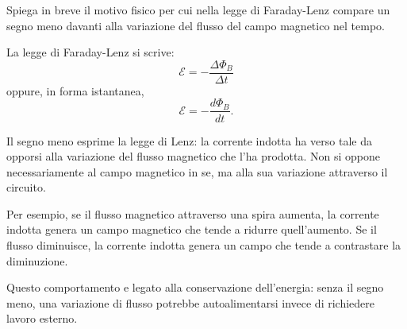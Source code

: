 
\begin{esercizio}
Spiega in breve il motivo fisico per cui nella legge di Faraday-Lenz compare
un segno meno davanti alla variazione del flusso del campo magnetico nel tempo.
\end{esercizio}

\begin{soluzione}
La legge di Faraday-Lenz si scrive:
\[
\mathcal{E}=-\frac{\Delta\Phi_B}{\Delta t}
\]
oppure, in forma istantanea,
\[
\mathcal{E}=-\frac{d\Phi_B}{dt}.
\]

Il segno meno esprime la legge di Lenz: la corrente indotta ha verso tale da
opporsi alla variazione del flusso magnetico che l'ha prodotta. Non si oppone
necessariamente al campo magnetico in se, ma alla sua variazione attraverso il
circuito.

Per esempio, se il flusso magnetico attraverso una spira aumenta, la corrente
indotta genera un campo magnetico che tende a ridurre quell'aumento. Se il
flusso diminuisce, la corrente indotta genera un campo che tende a contrastare
la diminuzione.

Questo comportamento e legato alla conservazione dell'energia: senza il segno
meno, una variazione di flusso potrebbe autoalimentarsi invece di richiedere
lavoro esterno.
\end{soluzione}
